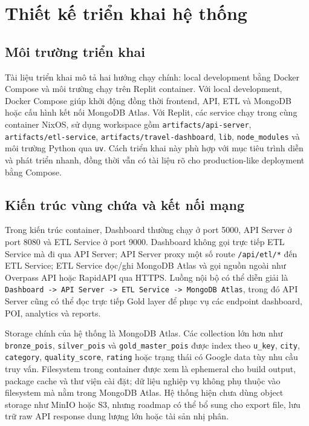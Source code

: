 \documentclass[12pt,a4paper]{article}
\begin{document}
\section{Thiết kế triển khai hệ thống}

\subsection{Môi trường triển khai}

Tài liệu triển khai mô tả hai hướng chạy chính: local development bằng Docker Compose và môi trường chạy trên Replit container. Với local development, Docker Compose giúp khởi động đồng thời frontend, API, ETL và MongoDB hoặc cấu hình kết nối MongoDB Atlas. Với Replit, các service chạy trong cùng container NixOS, sử dụng workspace gồm \texttt{artifacts/api-server}, \texttt{artifacts/etl-service}, \texttt{artifacts/travel-dashboard}, \texttt{lib}, \texttt{node\_modules} và môi trường Python qua \texttt{uv}. Cách triển khai này phù hợp với mục tiêu trình diễn và phát triển nhanh, đồng thời vẫn có tài liệu rõ cho production-like deployment bằng Compose.

\subsection{Kiến trúc vùng chứa và kết nối mạng}

Trong kiến trúc container, Dashboard thường chạy ở port 5000, API Server ở port 8080 và ETL Service ở port 9000. Dashboard không gọi trực tiếp ETL Service mà đi qua API Server; API Server proxy một số route \texttt{/api/etl/*} đến ETL Service; ETL Service đọc/ghi MongoDB Atlas và gọi nguồn ngoài như Overpass API hoặc RapidAPI qua HTTPS. Luồng nội bộ có thể diễn giải là \texttt{Dashboard -> API Server -> ETL Service -> MongoDB Atlas}, trong đó API Server cũng có thể đọc trực tiếp Gold layer để phục vụ các endpoint dashboard, POI, analytics và reports.

Storage chính của hệ thống là MongoDB Atlas. Các collection lớn hơn như \texttt{bronze\_pois}, \texttt{silver\_pois} và \texttt{gold\_master\_pois} được index theo \texttt{u\_key}, \texttt{city}, \texttt{category}, \texttt{quality\_score}, \texttt{rating} hoặc trạng thái có Google data tùy nhu cầu truy vấn. Filesystem trong container được xem là ephemeral cho build output, package cache và thư viện cài đặt; dữ liệu nghiệp vụ không phụ thuộc vào filesystem mà nằm trong MongoDB Atlas. Hệ thống hiện chưa dùng object storage như MinIO hoặc S3, nhưng roadmap có thể bổ sung cho export file, lưu trữ raw API response dung lượng lớn hoặc tài sản nhị phân.
\end{document}
